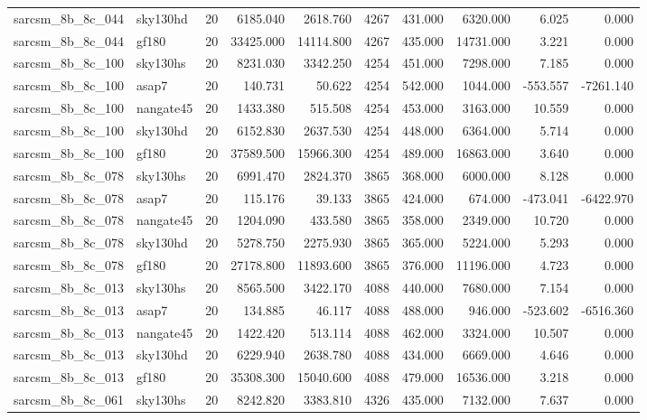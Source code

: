 \begin{longtable}{llrrrrrrrr}
sarcsm\_8b\_8c\_044 & sky130hd & 20 & 6185.040 & 2618.760 & 4267 & 431.000 & 6320.000 & 6.025 & 0.000 \\
sarcsm\_8b\_8c\_044 & gf180 & 20 & 33425.000 & 14114.800 & 4267 & 435.000 & 14731.000 & 3.221 & 0.000 \\
sarcsm\_8b\_8c\_100 & sky130hs & 20 & 8231.030 & 3342.250 & 4254 & 451.000 & 7298.000 & 7.185 & 0.000 \\
sarcsm\_8b\_8c\_100 & asap7 & 20 & 140.731 & 50.622 & 4254 & 542.000 & 1044.000 & -553.557 & -7261.140 \\
sarcsm\_8b\_8c\_100 & nangate45 & 20 & 1433.380 & 515.508 & 4254 & 453.000 & 3163.000 & 10.559 & 0.000 \\
sarcsm\_8b\_8c\_100 & sky130hd & 20 & 6152.830 & 2637.530 & 4254 & 448.000 & 6364.000 & 5.714 & 0.000 \\
sarcsm\_8b\_8c\_100 & gf180 & 20 & 37589.500 & 15966.300 & 4254 & 489.000 & 16863.000 & 3.640 & 0.000 \\
sarcsm\_8b\_8c\_078 & sky130hs & 20 & 6991.470 & 2824.370 & 3865 & 368.000 & 6000.000 & 8.128 & 0.000 \\
sarcsm\_8b\_8c\_078 & asap7 & 20 & 115.176 & 39.133 & 3865 & 424.000 & 674.000 & -473.041 & -6422.970 \\
sarcsm\_8b\_8c\_078 & nangate45 & 20 & 1204.090 & 433.580 & 3865 & 358.000 & 2349.000 & 10.720 & 0.000 \\
sarcsm\_8b\_8c\_078 & sky130hd & 20 & 5278.750 & 2275.930 & 3865 & 365.000 & 5224.000 & 5.293 & 0.000 \\
sarcsm\_8b\_8c\_078 & gf180 & 20 & 27178.800 & 11893.600 & 3865 & 376.000 & 11196.000 & 4.723 & 0.000 \\
sarcsm\_8b\_8c\_013 & sky130hs & 20 & 8565.500 & 3422.170 & 4088 & 440.000 & 7680.000 & 7.154 & 0.000 \\
sarcsm\_8b\_8c\_013 & asap7 & 20 & 134.885 & 46.117 & 4088 & 488.000 & 946.000 & -523.602 & -6516.360 \\
sarcsm\_8b\_8c\_013 & nangate45 & 20 & 1422.420 & 513.114 & 4088 & 462.000 & 3324.000 & 10.507 & 0.000 \\
sarcsm\_8b\_8c\_013 & sky130hd & 20 & 6229.940 & 2638.780 & 4088 & 434.000 & 6669.000 & 4.646 & 0.000 \\
sarcsm\_8b\_8c\_013 & gf180 & 20 & 35308.300 & 15040.600 & 4088 & 479.000 & 16536.000 & 3.218 & 0.000 \\
sarcsm\_8b\_8c\_061 & sky130hs & 20 & 8242.820 & 3383.810 & 4326 & 435.000 & 7132.000 & 7.637 & 0.000 \\

\end{longtable}
